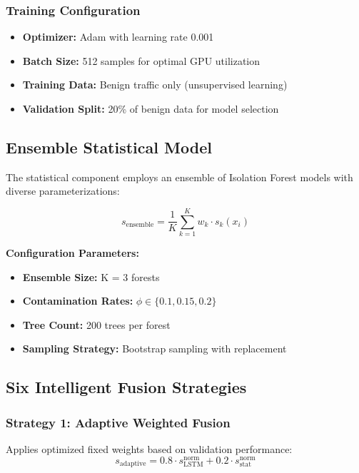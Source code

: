 \documentclass[conference]{IEEEtran}
\begin{document}
\subsubsection{Training Configuration}
\begin{itemize}
\item \textbf{Optimizer:} Adam with learning rate 0.001
\item \textbf{Batch Size:} 512 samples for optimal GPU utilization
\item \textbf{Training Data:} Benign traffic only (unsupervised learning)
\item \textbf{Validation Split:} 20\% of benign data for model selection
\end{itemize}

\subsection{Ensemble Statistical Model}

The statistical component employs an ensemble of Isolation Forest models with diverse parameterizations:

\begin{equation}
s_{\text{ensemble}} = \frac{1}{K} \sum_{k=1}^{K} w_k \cdot s_k(x_i)
\end{equation}

\textbf{Configuration Parameters:}
\begin{itemize}
\item \textbf{Ensemble Size:} K = 3 forests
\item \textbf{Contamination Rates:} $\phi \in \{0.1, 0.15, 0.2\}$
\item \textbf{Tree Count:} 200 trees per forest
\item \textbf{Sampling Strategy:} Bootstrap sampling with replacement
\end{itemize}

\subsection{Six Intelligent Fusion Strategies}

\subsubsection{Strategy 1: Adaptive Weighted Fusion}
Applies optimized fixed weights based on validation performance:
\begin{equation}
s_{\text{adaptive}} = 0.8 \cdot s_{\text{LSTM}}^{\text{norm}} + 0.2 \cdot s_{\text{stat}}^{\text{norm}}
\end{equation}
\end{document}
